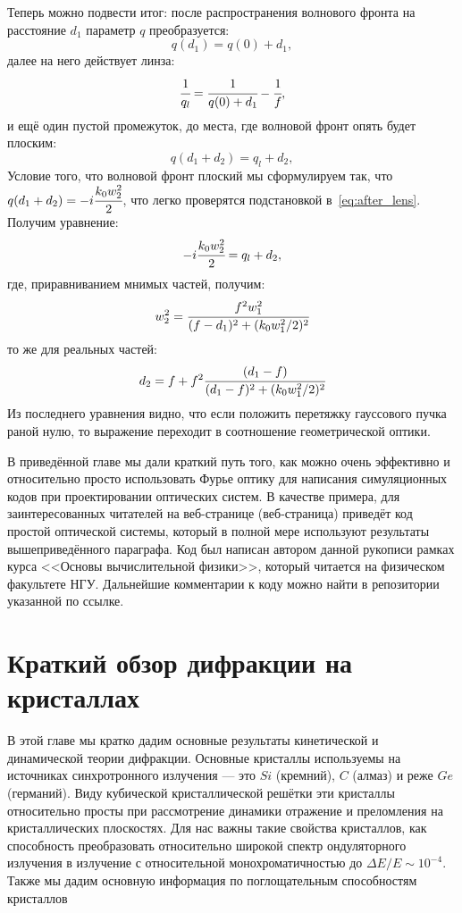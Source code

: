 Теперь можно подвести итог: после распространения волнового фронта на расстояние $d_1$ параметр $q$ преобразуется:
\begin{equation}
q(d_1) = q(0) + d_1, 
\end{equation}
далее на него действует линза: 
\begin{equation}
\cfrac{1}{q_l} = \cfrac{1}{q(0) + d_1} - \cfrac{1}{f},
\end{equation}
и ещё один пустой промежуток, до места, где волновой фронт опять будет плоским: 
\begin{equation}
q(d_1 + d_2) = q_l + d_2, 
\end{equation}
Условие того, что волновой фронт плоский мы сформулируем так, что $q(d_1 + d_2) = -i\cfrac{k_0w^2_2}{2}$, что легко проверятся подстановкой в~\ref{eq:after_lens}. Получим уравнение: 
\begin{equation}
-i\cfrac{k_0w^2_2}{2} = q_l + d_2, 
\end{equation}
где, приравниванием мнимых частей, получим: 
\begin{equation}
w^2_2 = \cfrac{f^2w^2_1}{(f - d_1)^2 + (k_0w^2_1/2)^2}
\end{equation}
то же для реальных частей: 
\begin{equation}
d_2 = f + f^2\cfrac{(d_1 - f)}{(d_1 - f)^2 + (k_0w^2_1/2)^2}
\end{equation}
Из последнего уравнения видно, что если положить перетяжку гауссового пучка раной нулю, то выражение переходит в соотношение геометрической оптики.

В приведённой главе мы дали краткий путь того, как можно очень эффективно и относительно просто использовать Фурье оптику для написания симуляционных кодов при проектировании оптических систем. В качестве примера, для заинтересованных читателей на веб-странице (веб-страница) приведёт код простой оптической системы, который в полной мере используют результаты вышеприведённого параграфа. Код был написан автором данной рукописи рамках курса <<Основы вычислительной физики>>, который читается на физическом факультете НГУ. Дальнейшие комментарии к коду можно найти в репозитории указанной по ссылке.


\chapter{Краткий обзор дифракции на кристаллах}
В этой главе мы кратко дадим основные результаты кинетической и динамической теории дифракции. Основные кристаллы используемы на источниках синхротронного излучения --- это $Si$ (кремний), $C$ (алмаз) и реже $Ge$ (германий). Виду кубической кристаллической решётки эти кристаллы относительно просты при рассмотрение динамики отражение и преломления на кристаллических плоскостях. Для нас важны такие свойства кристаллов, как способность преобразовать относительно широкой спектр ондуляторного излучения в излучение с относительной монохроматичностью до $\Delta E/ E \sim 10^{-4}$. Также мы дадим основную информация по поглощательным способностям кристаллов
